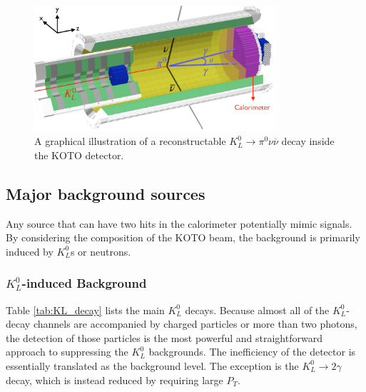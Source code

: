 \begin{figure}[h]
\begin{center}
\captionsetup{width=.99\linewidth}
\includegraphics[width=0.8\textwidth]{Figures/Chapter3/Detector_3D.pdf}
\caption{A graphical illustration of a reconstructable ${K_L^0 \to \pi^0 \nu \overline{\nu}}$ decay inside the KOTO detector.}
\label{fig:KOTO_signal_3D}
\end{center}
\end{figure}


\subsection{Major background sources}
Any source that can have two hits in the calorimeter potentially mimic signals. By considering the composition of the KOTO beam, the background is primarily induced by $K_L^0$s or neutrons.

\subsubsection{$K_L^0$-induced Background}
Table \ref{tab:KL_decay} lists the main $K_L^0$ decays. Because almost all of the $K_L^0$-decay channels are accompanied by charged particles or more than two photons, the detection of those particles is the most powerful and straightforward approach to suppressing the $K_L^0$ backgrounds. The inefficiency of the detector is essentially translated as the background level. The exception is the $K_L^0\to2\gamma$ decay, which is instead reduced by requiring large $P_T$. 



